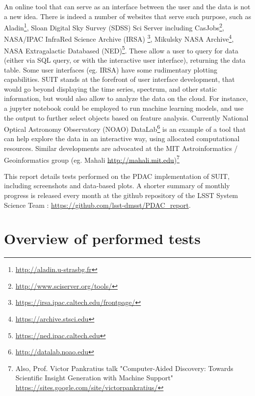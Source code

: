 \documentclass[DM,lsstdraft,toc,usenatbib]{lsstdoc}
\begin{document}
An online tool that can serve as an interface between the user and the data is not a new idea.  There is indeed a number of websites that serve such purpose, such as  Aladin\footnote{\url{http://aladin.u-strasbg.fr}},  Sloan Digital Sky Survey (SDSS) Sci Server including CasJobs\footnote{\url{http://www.sciserver.org/tools/}},  NASA/IPAC  InfraRed  Science Archive (IRSA) \footnote{\url{https://irsa.ipac.caltech.edu/frontpage/}},  Mikulsky NASA Archive\footnote{\url{https://archive.stsci.edu}}, NASA Extragalactic Databased (NED)\footnote{\url{https://ned.ipac.caltech.edu}}. These allow a user to query for data (either via SQL query, or with the interactive user interface), returning the data table. Some user interfaces (eg. IRSA) have some rudimentary plotting capabilities.  SUIT stands at the forefront of user interface development, that would go beyond displaying the time series, spectrum, and other static information, but would also allow to analyze the data on the cloud. For instance,  a jupyter notebook could be employed to run machine learning models, and use the output to further select objects based on feature analysis. Currently National Optical Astronomy Observatory (NOAO)  DataLab\footnote{\url{http://datalab.noao.edu}} is an example of a tool that can help explore the data in an interactive way, using allocated computational resources. Similar developments are advocated at the MIT Astroinformatics / Geoinformatics group (eg. Mahali \url{http://mahali.mit.edu})\footnote{Also, Prof. Victor Pankratius talk "Computer-Aided Discovery: Towards Scientific Insight Generation with Machine Support" \url{https://sites.google.com/site/victorpankratius/}}


This report details tests performed on the PDAC implementation of SUIT, including screenshots and data-based plots.  A shorter summary of monthly progress is released every month at the github repository of the LSST System Science Team : \url{https://github.com/lsst-dmsst/PDAC_report}. 




\section{Overview of performed tests}
\end{document}
